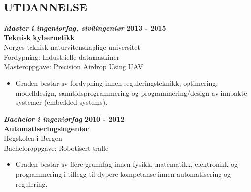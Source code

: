 \documentclass[margin, 10pt, norsk]{res} %
\begin{document}
\begin{resume}

 



\hspace{10mm}  

\section{UTDANNELSE}

\textbf{\emph{Master i ingeniørfag, sivilingeniør} \hfill 2013 - 2015
\\Teknisk kybernetikk}  \\
Norges teknisk-naturvitenskaplige universitet \\
Fordypning: Industrielle datamaskiner\\
Masteroppgave: Precision Airdrop Using UAV 
\begin{itemize} \itemsep -2pt %
\item Graden består av fordypning innen reguleringsteknikk, optimering, modelldesign, sanntidsprogrammering og programmering/design av innbakte systemer (embedded systems).
\end{itemize}

\textbf{\emph{Bachelor i ingeniørfag }\hfill 2010 - 2012\\
Automatiseringsingeniør} \\
Høgskolen i Bergen \\
Bacheloroppgave: Robotisert tralle   %
\begin{itemize} \itemsep -2pt %
\item Graden består av flere grunnfag innen fysikk, matematikk, elektronikk og programmering i tillegg til dypere kompetanse innen automatisering og regulering. 
\end{itemize}


\end{resume}
\end{document}
